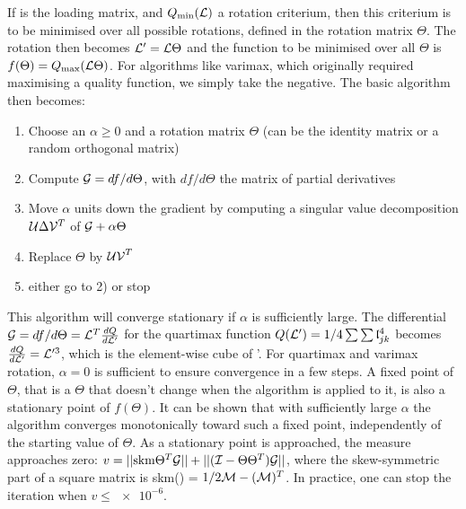 If  is the loading matrix, and \( Q_\mathrm{min}(\mathcal{L}) \) a rotation criterium, then this criterium is to be minimised over all possible rotations, defined in the rotation matrix \( \Theta \). The rotation then becomes \parencite{Jen-01} \( \mathcal{L}' = \mathcal{L} \Theta \) and the function to be minimised over all \( \Theta \) is \( f(\Theta) = Q_\mathrm{max}(\mathcal{L}\Theta) \). For algorithms like varimax, which originally required maximising a quality function, we simply take the negative. The basic algorithm then becomes:
\begin{enumerate}
  \item{Choose an \( \alpha \geq 0 \) and a rotation matrix \( \Theta \) (can be the identity matrix or a random orthogonal matrix) }
  \item{Compute \( \mathcal{G} = df/d\Theta \), with \( df/d\Theta \) the matrix of partial derivatives }
  \item{Move \( \alpha \) units down the gradient by computing a singular value decomposition \( \mathcal{U}\Delta\mathcal{V}^T \) of \( \mathcal{G} + \alpha\Theta \) }
  \item{Replace \( \Theta \) by \( \mathcal{UV}^T \)}
  \item{either go to 2) or stop }
\end{enumerate}
This algorithm will converge stationary if \( \alpha \) is sufficiently large. The differential \( \mathcal{G} = df/d\Theta = \mathcal{L}^T \frac{dQ}{d\mathcal{L}'} \) for the quartimax function \(Q(\mathcal{L}') = 1/4 \sum{\sum{\ensuremath{\mathfrak{l}}_{jk}^4}} \) becomes \( \frac{dQ}{d\mathcal{L}'} = \mathcal{L}'^3 \), which is the element-wise cube of '. For quartimax and varimax rotation, \( \alpha = 0 \) is sufficient to ensure convergence in a few steps. A fixed point of \( \Theta \), that is a \( \Theta \) that doesn't change when the algorithm is applied to it, is also a stationary point of \( f(\Theta) \). It can be shown that with sufficiently large \( \alpha \) the algorithm converges monotonically toward such a fixed point, independently of the starting value of \( \Theta \). As a stationary point is approached, the measure  approaches zero: \(v = ||\mathrm{skm} \Theta^T \mathcal{G}|| + ||(\mathcal{I} - \Theta \Theta^T) \mathcal{G}|| \), where the skew-symmetric part of a square matrix is skm() = \( 1/2 \mathcal{M}-(\mathcal{M})^T \). In practice, one can stop the iteration when \( v \leq \num{e-6} \).

